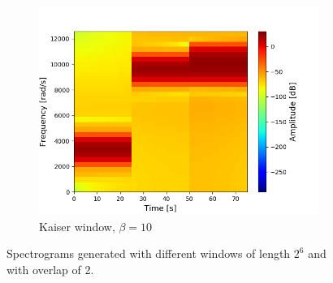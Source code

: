 \begin{figure}[H]
\begin{subfigure}{0.49\textwidth}
\includegraphics[width=\textwidth]{figures/stft_windows/100/kaiser_10.png}
\caption{Kaiser window, $\beta=10$}
\label{fig:stft_kaiser_100_10}
\end{subfigure}
\caption{Spectrograms generated with different windows of length $2^6$ and with overlap of 2.}
\label{fig:stft_windows_100}
\end{figure}
